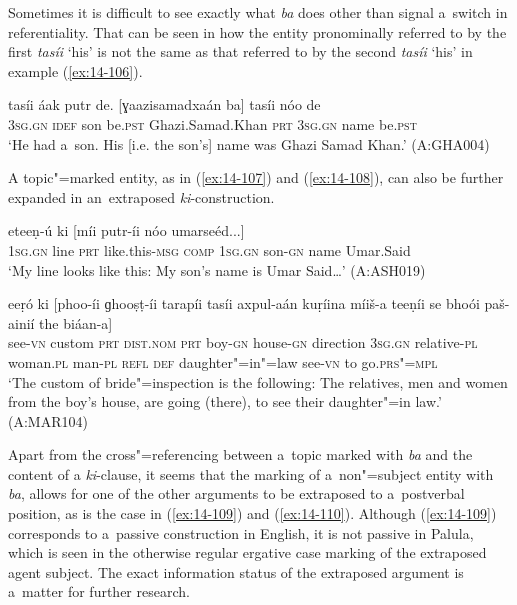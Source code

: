 Sometimes it is difficult to see exactly what \textit{ba} does other than signal a~switch in referentiality. That can be seen in how the entity pronominally referred to by the first \textit{tasíi} `his' is not the same as that referred to by the second \textit{tasíi} `his' in example (\ref{ex:14-106}).

\begin{exe}
\ex
\label{ex:14-106}
\gll tasíi áak putr de. [ɣaazisamadxaán ba]  tasíi nóo de \\
\textsc{3sg.gn} \textsc{idef} son be.\textsc{pst} Ghazi.Samad.Khan \textsc{prt}  \textsc{3sg.gn} name be.\textsc{pst} \\
\glt `He had a~son. His [i.e. the son's] name was Ghazi Samad Khan.' (A:GHA004)
\end{exe}

A topic"=marked entity, as in (\ref{ex:14-107}) and (\ref{ex:14-108}), can also be further expanded in an~extraposed \textit{ki}-construction.

\begin{exe}
\ex
\label{ex:14-107}
 eteeṇ-ú ki [míi putr-íi  nóo umarseéd...] \\
\textsc{1sg.gn} line \textsc{prt} like.this-\textsc{msg } \textsc{comp} \textsc{1sg.gn} son-\textsc{gn}  name Umar.Said \\
\glt `My line looks like this: My son's name is Umar Said{\ldots}' (A:ASH019)

\ex
\label{ex:14-108}
 eeṛó ki [phoo-íi  ɡhooṣṭ-íi tarapíi tasíi
  axpul-aán kuṛíina  míiš-a teeṇíi se bhoói paš-ainií the biáan-a] \\
see-\textsc{vn} custom \textsc{prt} \textsc{dist.nom} \textsc{prt} boy-\textsc{gn}  house-\textsc{gn} direction \textsc{3sg.gn} relative-\textsc{pl} woman.\textsc{pl}  man-\textsc{pl} \textsc{refl } \textsc{def} daughter"=in"=law see-\textsc{vn} to go.\textsc{prs"=mpl} \\
\glt `The custom of bride"=inspection is the following: The relatives, men and women from the boy's house, are going (there), to see their daughter"=in law.' (A:MAR104)
\end{exe}

Apart from the cross"=referencing between a~topic marked with \textit{ba} and the content of a \textit{ki}-clause, it seems that the marking of a~non"=subject entity with \textit{ba}, allows for one of the other arguments to be extraposed to a~postverbal position, as is the case in (\ref{ex:14-109}) and (\ref{ex:14-110}). Although (\ref{ex:14-109}) corresponds to a~passive construction in English, it is not passive in Palula, which is seen in the otherwise regular ergative case marking of the extraposed agent subject. The exact information status of the extraposed argument is a~matter for further research.

